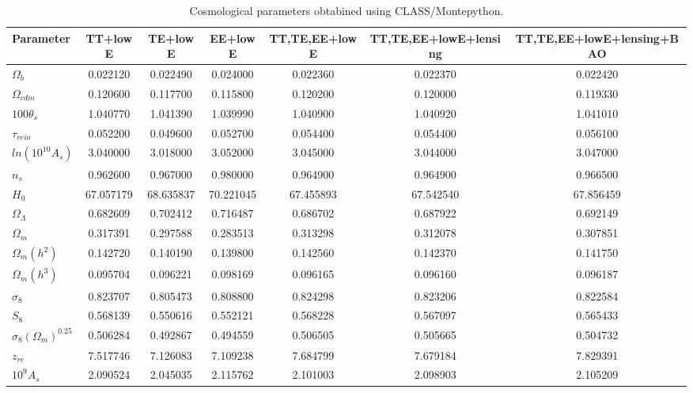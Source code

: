 \documentclass[a4paper,landscape]{article}
\begin{document}
\begin{table}[htbp]
\centering
\caption{Cosmological parameters obtabined using CLASS/Montepython.}
\renewcommand{\arraystretch}{1.2}
\begin{tabular}{
    l
    S[table-format=1.5(5)] S[table-format=1.5(5)] S[table-format=1.5(5)] 
    S[table-format=1.5(5)] S[table-format=1.5(5)] S[table-format=1.5(5)]
}
\toprule
\textbf{Parameter} 
& {\textbf{TT+lowE}} 
& {\textbf{TE+lowE}} 
& {\textbf{EE+lowE}} 
& {\textbf{TT,TE,EE+lowE}} 
& {\textbf{TT,TE,EE+lowE+lensing}} 
& {\textbf{TT,TE,EE+lowE+lensing+BAO}} \\
\midrule
$\Omega_b$ & 0.022120 & 0.022490 & 0.024000 & 0.022360 & 0.022370 & 0.022420 \\
$\Omega_{cdm}$ & 0.120600 & 0.117700 & 0.115800 & 0.120200 & 0.120000 & 0.119330 \\
$100\theta_{s}$ & 1.040770 & 1.041390 & 1.039990 & 1.040900 & 1.040920 & 1.041010 \\
$\tau_{reio}$ & 0.052200 & 0.049600 & 0.052700 & 0.054400 & 0.054400 & 0.056100 \\
$ln(10^{10}A_s)$ & 3.040000 & 3.018000 & 3.052000 & 3.045000 & 3.044000 & 3.047000 \\
$n_s$ & 0.962600 & 0.967000 & 0.980000 & 0.964900 & 0.964900 & 0.966500 \\
\midrule
$H_0$ & 67.057179 & 68.635837 & 70.221045 & 67.455893 & 67.542540 & 67.856459 \\
$\Omega_{\Lambda}$ & 0.682609 & 0.702412 & 0.716487 & 0.686702 & 0.687922 & 0.692149 \\
$\Omega_m$ & 0.317391 & 0.297588 & 0.283513 & 0.313298 & 0.312078 & 0.307851 \\
$\Omega_m (h^2)$ & 0.142720 & 0.140190 & 0.139800 & 0.142560 & 0.142370 & 0.141750 \\
$\Omega_m (h^3)$ & 0.095704 & 0.096221 & 0.098169 & 0.096165 & 0.096160 & 0.096187 \\
$\sigma_8$ & 0.823707 & 0.805473 & 0.808800 & 0.824298 & 0.823206 & 0.822584 \\
$S_8$ & 0.568139 & 0.550616 & 0.552121 & 0.568228 & 0.567097 & 0.565433 \\
$\sigma_8 (\Omega_m)^{0.25}$ & 0.506284 & 0.492867 & 0.494559 & 0.506505 & 0.505665 & 0.504732 \\
$z_{re}$ & 7.517746 & 7.126083 & 7.109238 & 7.684799 & 7.679184 & 7.829391 \\
$10^9 A_s$ & 2.090524 & 2.045035 & 2.115762 & 2.101003 & 2.098903 & 2.105209 \\

\end{tabular}
\end{table}
\end{document}
